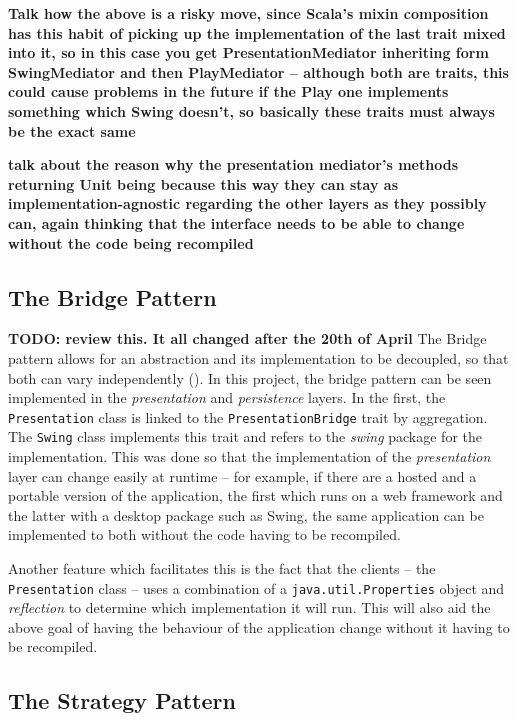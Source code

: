\textbf{Talk how the above is a risky move, since Scala's mixin composition has
this habit of picking up the implementation of the last trait mixed into it, so
in this case you get PresentationMediator inheriting form SwingMediator and
then PlayMediator -- although both are traits, this could cause problems in the
future if the Play one implements something which Swing doesn't, so basically
these traits must always be the exact same}

\textbf{talk about the reason why the presentation mediator's methods returning
Unit being because this way they can stay as implementation-agnostic regarding
the other layers as they possibly can, again thinking that the interface needs
to be able to change without the code being recompiled}

\subsection{The Bridge Pattern} \label{sec:Implementation.TheBridgePattern}
\textbf{TODO: review this. It all changed after the 20th of April}
The Bridge pattern allows for an abstraction and its implementation to be
decoupled, so that both can vary independently
(\cite[][Ch.~7,Location~2699]{nikolov2016scala}). In this project, the bridge
pattern can be seen implemented in the \emph{presentation} and
\emph{persistence} layers. In the first, the \texttt{Presentation} class is
linked to the \texttt{PresentationBridge} trait by aggregation. The
\texttt{Swing} class implements this trait and refers to the \emph{swing}
package for the implementation. This was done so that the implementation of the
\emph{presentation} layer can change easily at runtime -- for example, if there
are a hosted and a portable version of the application, the first which runs on
a web framework and the latter with a desktop package such as Swing, the same
application can be implemented to both without the code having to be
recompiled.

Another feature which facilitates this is the fact that the clients -- the
\texttt{Presentation} class -- uses a combination of a
\texttt{java.util.Properties} object and \emph{reflection} to determine which
implementation it will run. This will also aid the above goal of having the
behaviour of the application change without it having to be recompiled.


\subsection{The Strategy Pattern} \label{sec:Implementation.TheStrategyPattern}

